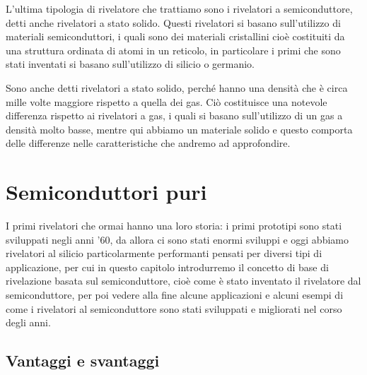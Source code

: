 L'ultima tipologia di rivelatore che trattiamo sono i rivelatori a semiconduttore, detti anche rivelatori a stato solido. Questi rivelatori si basano sull'utilizzo di materiali semiconduttori, i quali sono dei materiali cristallini cioè costituiti da una struttura ordinata di atomi in un reticolo, in particolare i primi che sono stati inventati si basano sull'utilizzo di silicio o germanio.

Sono anche detti rivelatori a stato solido, perché hanno una densità che è circa mille volte maggiore rispetto a quella dei gas. Ciò costituisce una notevole differenza rispetto ai rivelatori a gas, i quali si basano sull'utilizzo di un gas a densità molto basse, mentre qui abbiamo un materiale solido e questo comporta delle differenze nelle caratteristiche che andremo ad approfondire.

\section{Semiconduttori puri}
I primi rivelatori che ormai hanno una loro storia: i primi prototipi sono stati sviluppati negli anni '60, da allora ci sono stati enormi sviluppi e oggi abbiamo rivelatori al silicio particolarmente performanti pensati per diversi tipi di applicazione, per cui in questo capitolo introdurremo il concetto di base di rivelazione basata sul semiconduttore, cioè come è stato inventato il rivelatore dal semiconduttore, per poi vedere alla fine alcune applicazioni e alcuni esempi di come i rivelatori al semiconduttore sono stati sviluppati e migliorati nel corso degli anni.

\subsection{Vantaggi e svantaggi}

